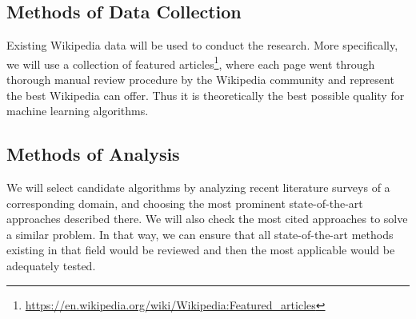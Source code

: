 \subsection{Methods of Data Collection}
Existing Wikipedia data will be used to conduct the research. More specifically, we will use a collection of featured articles\footnote{\url{https://en.wikipedia.org/wiki/Wikipedia:Featured_articles}}, where each page went through thorough manual review procedure by the Wikipedia community and represent the best Wikipedia can offer. Thus it is theoretically the best possible quality for machine learning algorithms.

\subsection{Methods of Analysis}
We will select candidate algorithms by analyzing recent literature surveys of a corresponding domain, and choosing the most prominent state-of-the-art approaches described there. We will also check the most cited approaches to solve a similar problem. In that way, we can ensure that all state-of-the-art methods existing in that field would be reviewed and then the most applicable would be adequately tested.
\endinput
